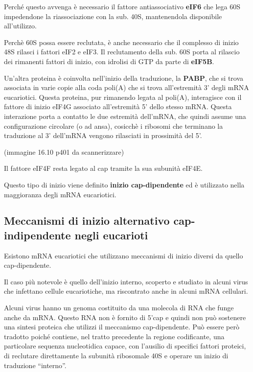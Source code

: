 \documentclass[11pt]{book}
\begin{document}
Perché questo avvenga è necessario il fattore antiassociativo
\textbf{eIF6} che lega 60S impedendone la riassociazione con la sub.
40S, mantenendola disponibile all'utilizzo.

Perchè 60S possa essere reclutata, è anche necessario che il complesso
di inizio 48S rilasci i fattori eIF2 e eIF3. Il reclutamento della sub.
60S porta al rilascio dei rimanenti fattori di inizio, con idrolisi di
GTP da parte di \textbf{eIF5B}.

Un'altra proteina è coinvolta nell'inizio della traduzione, la
\textbf{PABP}, che si trova associata in varie copie alla coda poli(A)
che si trova all'estremità 3' degli mRNA eucariotici. Questa proteina,
pur rimanendo legata al poli(A), interagisce con il fattore di inizio
eIF4G associato all'estremità 5' dello stesso mRNA. Questa interazione
porta a contatto le due estremità dell'mRNA, che quindi assume una
configurazione circolare (o ad ansa), cosicchè i ribosomi che terminano
la traduzione al 3' dell'mRNA vengono rilasciati in prossimità del 5'.

(immagine 16.10 p401 da scannerizzare)

Il fattore eIF4F resta legato al cap tramite la sua subunità eIF4E.

Questo tipo di inizio viene definito \textbf{inizio cap-dipendente} ed è
utilizzato nella maggioranza degli mRNA eucariotici.

\subsection{Meccanismi di inizio alternativo cap-indipendente negli
eucarioti}\label{meccanismi-di-inizio-alternativo-cap-indipendente-negli-eucarioti}

Esistono mRNA eucariotici che utilizzano meccanismi di inizio diversi da
quello cap-dipendente.

Il caso più notevole è quello dell'inizio interno, scoperto e studiato
in alcuni virus che infettano cellule eucariotiche, ma riscontrato anche
in alcuni mRNA cellulari.

Alcuni virus hanno un genoma costituito da una molecola di RNA che funge
anche da mRNA. Questo RNA non è fornito di 5'cap e quindi non può
sostenere una sintesi proteica che utilizzi il meccanismo
cap-dipendente. Può essere però tradotto poiché contiene, nel tratto
precedente la regione codificante, una particolare sequenza nucleotidica
capace, con l'ausilio di specifici fattori proteici, di reclutare
direttamente la subunità ribosomale 40S e operare un inizio di
traduzione ``interno''.
\end{document}
